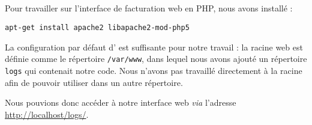 \subsection{\apa}

Pour travailler sur l’interface de facturation web en PHP, nous avons installé {\apa} :

\begin{verbatim}
apt-get install apache2 libapache2-mod-php5
\end{verbatim}

La configuration par défaut d’{\apa} est suffisante pour notre travail : la racine web est définie comme le répertoire \texttt{/var/www}, dans lequel nous avons ajouté un répertoire \texttt{logs} qui contenait notre code. Nous n’avons pas travaillé directement à la racine afin de pouvoir utiliser {\pma} dans un autre répertoire.

Nous pouvions donc accéder à notre interface web \textit{via} l’adresse \url{http://localhost/logs/}.
